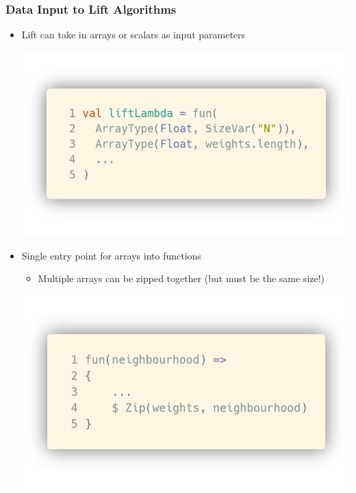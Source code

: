 \documentclass[10pt]{beamer}
\begin{document}
\begin{frame}
\frametitle{Data Input to Lift Algorithms}
\begin{itemize}
    \item Lift can take in arrays or scalars as input parameters
            \vspace{-1.2cm}
\begin{block}{}
    \begin{center}
    \includegraphics[width=.5\textwidth]{../images/inputData.png}
    \end{center}
\end{block}
    \item Single entry point for arrays into functions  
            \begin{itemize}
                \item Multiple arrays can be zipped together (but must be the same size!) 
            \end{itemize}
            \vspace{-1.5cm}
\begin{block}{}
    \begin{center}
    \includegraphics[width=.5\textwidth]{../images/zippedData.png}
    \end{center}
\end{block}
\end{itemize}
\end{frame}
\end{document}
